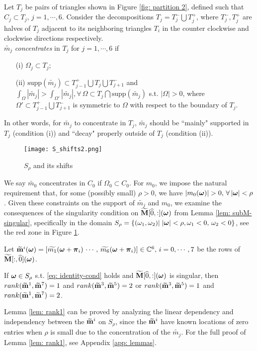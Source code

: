 Let $T_j$ be pairs of triangles shown in Figure \ref{fig: partition 2}, defined such that $C_j\subset T_j,\, j = 1,\cdots,6.$ Consider the decompositions $T_j = T_j^-\bigcup T_j^+$, where $T_j^-, T_j^+$ are halves of $T_j$ adjacent to its neighboring triangles $T_i$ in the counter clockwise and clockwise directions respectively.\\[.5em]
  $\widetilde{m_j}$ {\it concentrates} in $T_j$ for $j = 1,\cdots,6$ if 
\begin{itemize}
\item[(i)] $\Omega_j\subset T_j$;
\item[(ii)] $\text{supp}(\widetilde{m_j})\subset T_{j-1}^+\bigcup T_j\bigcup T_{j+1}^-$ and $\int_\Omega|\widetilde{m_j}| > \int_{\Omega'}|\widetilde{m_j}|, \forall\, \Omega\subset T_j\bigcap\text{supp}(\widetilde{m_j})$ s.t. $|\Omega|>0$, where $\Omega' \subset T_{j-1}^+\bigcup T_{j+1}^-$ is symmetric to $\Omega$ with respect to the boundary of $T_j$.
\end{itemize}
In other words, for $\widetilde{m_j}$ to concentrate in $T_j$, $\widetilde{m_j}$ should be ``mainly" supported in $T_j$ (condition (i)) and ``decay" properly outside of $T_j$ (condition (ii)).

\begin{figure}
\centering
\texttt{[image: S\_shifts2.png]}
\caption{$S_{\rho}$ and its shifts}
\label{fig: S-shifts}
\end{figure}
We say $\widetilde{m_0}$ concentrates in $C_0$ if $\Omega_0\subset C_0$.
For $m_0$, we impose the natural requirement that, for some (possibly small) $\rho>0$, we have $|m_0(\boldsymbol{\omega})| > 0,\, \forall\, |\boldsymbol{\omega}| < \rho$.
Given these constraints on the support of $\widetilde{m_j}$ and $m_0$, we examine the consequences of the singularity condition on $\widetilde{\mathbf{M}}[\widehat{0},:](\boldsymbol{\omega})$ from Lemma \ref{lem: subM-singular}, specifically in the domain $S_{\rho} = \{(\omega_1,\omega_2)|\;|\boldsymbol{\omega}| < \rho, \omega_1 <0,\,\omega_2<0\}$, see the red zone in Figure \ref{fig: S-shifts}. 

Let $\widetilde{\mathbf{m}}^{i}(\boldsymbol{\omega}) = [\widetilde{m_1}(\boldsymbol{\omega}+\boldsymbol{\pi}_i)\, \cdots,\,\widetilde{m_6}(\boldsymbol{\omega}+\boldsymbol{\pi}_i)]\in\mathbb{C}^6,\, i = 0,\cdots,7$ be the rows of $\widetilde{\mathbf{M}}[:,\widehat{0}](\boldsymbol{\omega})$. 
\begin{lemma}\label{lem: rank1}
If $\boldsymbol{\omega}\in S_\rho$ s.t. \eqref{eq: identity-cond} holds and $\widetilde{\mathbf{M}}[\widehat{0},:](\boldsymbol{\omega})$ is singular, then  $rank(\widetilde{\mathbf{m}}^{1},\widetilde{\mathbf{m}}^{7}) = 1$ and $rank(\widetilde{\mathbf{m}}^{3},\widetilde{\mathbf{m}}^{5}) = 2$ or $rank(\widetilde{\mathbf{m}}^{3},\widetilde{\mathbf{m}}^{5}) = 1$ and $rank(\widetilde{\mathbf{m}}^{1},\widetilde{\mathbf{m}}^{7}) = 2$.
\end{lemma}
Lemma \ref{lem: rank1} can be proved by analyzing the linear dependency and independency between the $\widetilde{\mathbf{m}}^{i}$ on $S_\rho$, since the $\widetilde{\mathbf{m}}^{i}$ have known locations of zero entries when $\rho$ is small due to the concentration of the $\widetilde{m_j}$.
For the full proof of Lemma \ref{lem: rank1}, see Appendix \ref{app: lemmas}.

